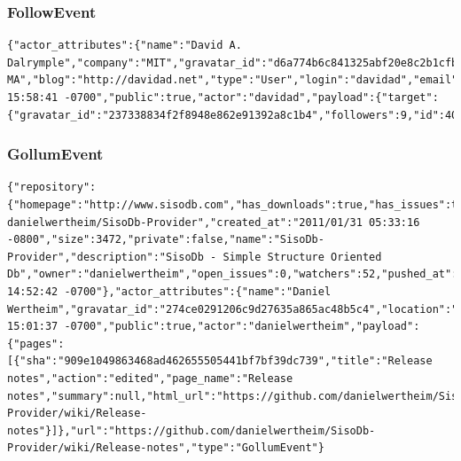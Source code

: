 \documentclass[a4paper,10pt]{article}
\begin{document}
\subsubsection{FollowEvent}
\begin{lstlisting}
{"actor_attributes":{"name":"David A. Dalrymple","company":"MIT","gravatar_id":"d6a774b6c841325abf20e8c2b1cfb43b","location":"Cambridge, MA","blog":"http://davidad.net","type":"User","login":"davidad","email":"davidad@alum.mit.edu"},"created_at":"2012/04/11 15:58:41 -0700","public":true,"actor":"davidad","payload":{"target":{"gravatar_id":"237338834f2f8948e862e91392a8c1b4","followers":9,"id":40273,"repos":17,"login":"saizai"}},"url":"https://github.com/saizai","type":"FollowEvent"}
\end{lstlisting}


\subsubsection{GollumEvent}
\begin{lstlisting}
{"repository":{"homepage":"http://www.sisodb.com","has_downloads":true,"has_issues":true,"forks":4,"language":"C#","fork":false,"has_wiki":true,"url":"https://github.com/
danielwertheim/SisoDb-Provider","created_at":"2011/01/31 05:33:16 -0800","size":3472,"private":false,"name":"SisoDb-Provider","description":"SisoDb - Simple Structure Oriented Db","owner":"danielwertheim","open_issues":0,"watchers":52,"pushed_at":"2012/04/11 14:52:42 -0700"},"actor_attributes":{"name":"Daniel Wertheim","gravatar_id":"274ce0291206c9d27635a865ac48b5c4","location":"Sweden","blog":"http://daniel.wertheim.se","type":"User","login":"danielwertheim"},"created_at":"2012/04/11 15:01:37 -0700","public":true,"actor":"danielwertheim","payload":{"pages":[{"sha":"909e1049863468ad462655505441bf7bf39dc739","title":"Release notes","action":"edited","page_name":"Release notes","summary":null,"html_url":"https://github.com/danielwertheim/SisoDb-Provider/wiki/Release-notes"}]},"url":"https://github.com/danielwertheim/SisoDb-Provider/wiki/Release-notes","type":"GollumEvent"}
\end{lstlisting}
\end{document}
